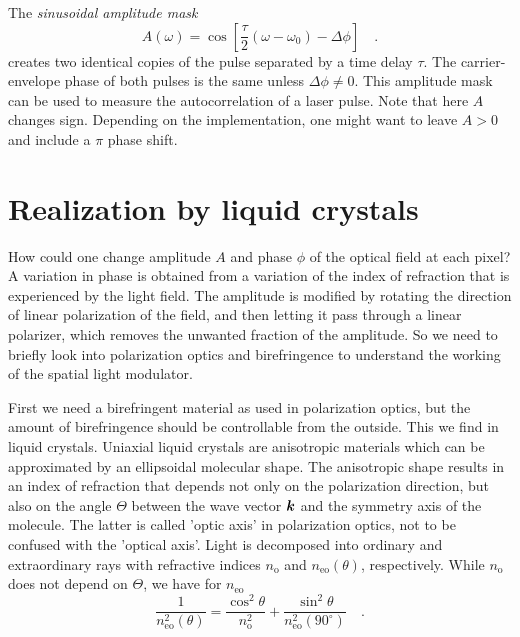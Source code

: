 The \emph{sinusoidal amplitude mask}
\begin{equation}
	A(\omega) = \cos \left[ \frac{\tau}{2} (\omega-\omega_{0}) - \Delta\phi \right] \quad .
\end{equation}
creates two identical copies of the pulse separated by a time delay $\tau$. The carrier-envelope phase of both pulses is the same unless $\Delta\phi \neq 0$. This amplitude mask can be used to measure the autocorrelation of a laser pulse. Note that here $A$ changes sign. Depending on the implementation, one might want to leave $A >0$ and include a $\pi$ phase shift.




\section{Realization by liquid crystals}


How could one change   amplitude $A$ and phase $\phi$ of the optical field at each pixel? A variation in phase is obtained from a variation of the index of refraction that is experienced by the light field. The amplitude is modified by rotating the direction of linear polarization of the field, and then letting it pass through a linear polarizer, which removes the unwanted fraction of the amplitude. So we need to briefly look into polarization optics and birefringence to understand the working of the spatial light modulator.


First we need a birefringent material as used in polarization optics, but the amount of birefringence should be controllable from the outside. This we find in liquid crystals.
Uniaxial liquid crystals are anisotropic materials which can be approximated by an ellipsoidal molecular shape. The anisotropic shape results in an index of refraction that depends not only on the polarization direction, but also on the angle $\Theta$ between the wave vector $\boldsymbol{k}$ and the symmetry axis of the molecule. The latter is called 'optic axis' in polarization optics, not to be confused with the 'optical axis'. 
Light is  decomposed into ordinary and extraordinary rays with refractive indices $n_{\text{o}}$ and $n_{\text{eo}}(\theta)$, respectively. While $n_{\text{o}}$ does not depend on $\Theta$, we have for $n_{\text{eo}}$
\begin{equation}
	\frac{1}{n_{\text{eo}}^{2}(\theta)} = \frac{\cos^{2}\theta}{n_{\text{o}}^{2}} + \frac{\sin^{2}\theta}{n_{\text{eo}}^{2}(90^{\circ})} \quad .
\end{equation}
 
